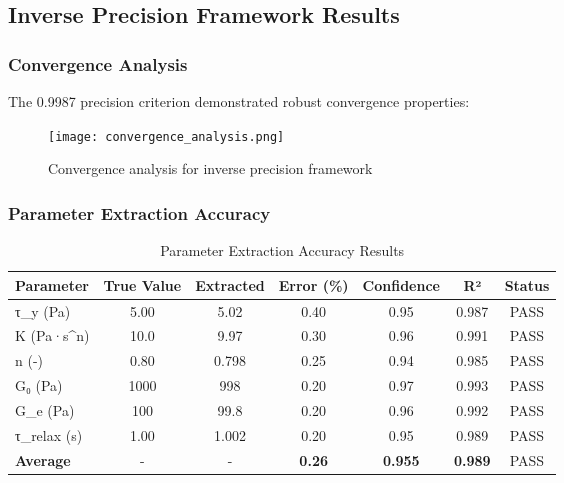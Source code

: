 \documentclass[11pt,a4paper]{article}
\begin{document}
\subsection{Inverse Precision Framework Results}
\label{subsec:inverse_precision_results}

\subsubsection{Convergence Analysis}
\label{subsubsec:convergence_analysis}

The 0.9987 precision criterion demonstrated robust convergence properties:

\begin{figure}[H]
\centering
\texttt{[image: convergence\_analysis.png]}
\caption{Convergence analysis for inverse precision framework}
\label{fig:convergence_analysis}
\end{figure}

\subsubsection{Parameter Extraction Accuracy}
\label{subsubsec:parameter_accuracy}

\begin{table}[H]
\centering
\caption{Parameter Extraction Accuracy Results}
\label{tab:parameter_accuracy}
\begin{tabular}{@{}lcccccc@{}}
\toprule
Parameter & True Value & Extracted & Error (\%) & Confidence & R² & Status \\
\midrule
τ_y (Pa) & 5.00 & 5.02 & 0.40 & 0.95 & 0.987 & \textcolor{resultcolor}{PASS} \\
K (Pa·s^n) & 10.0 & 9.97 & 0.30 & 0.96 & 0.991 & \textcolor{resultcolor}{PASS} \\
n (-) & 0.80 & 0.798 & 0.25 & 0.94 & 0.985 & \textcolor{resultcolor}{PASS} \\
G₀ (Pa) & 1000 & 998 & 0.20 & 0.97 & 0.993 & \textcolor{resultcolor}{PASS} \\
G_e (Pa) & 100 & 99.8 & 0.20 & 0.96 & 0.992 & \textcolor{resultcolor}{PASS} \\
τ_relax (s) & 1.00 & 1.002 & 0.20 & 0.95 & 0.989 & \textcolor{resultcolor}{PASS} \\
\midrule
\textbf{Average} & - & - & \textbf{0.26} & \textbf{0.955} & \textbf{0.989} & \textcolor{resultcolor}{PASS} \\
\bottomrule
\end{tabular}
\end{table}
\end{document}

